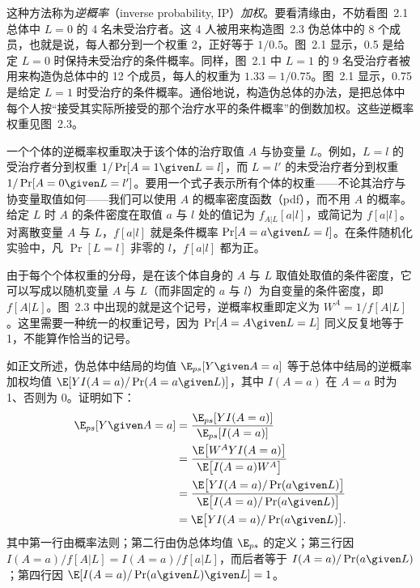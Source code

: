 这种方法称为\emph{逆概率}（inverse probability, IP）\emph{加权}。要看清缘由，不妨看图~2.1 总体中 $L=0$ 的 4 名未受治疗者。这 4 人被用来构造图~2.3 伪总体中的 8 个成员，也就是说，每人都分到一个权重 2，正好等于 $1/0.5$。图~2.1 显示，0.5 是给定 $L=0$ 时保持未受治疗的条件概率。同样，图~2.1 中 $L=1$ 的 9 名受治疗者被用来构造伪总体中的 12 个成员，每人的权重为 $1.33=1/0.75$。图~2.1 显示，0.75 是给定 $L=1$ 时受治疗的条件概率。通俗地说，构造伪总体的办法，是把总体中每个人按“接受其实际所接受的那个治疗水平的条件概率”的倒数加权。这些逆概率权重见图~2.3。


\begin{techpoint}[逆概率权重的形式定义]
一个个体的逆概率权重取决于该个体的治疗取值 $A$ 与协变量 $L$。例如，$L=l$ 的受治疗者分到权重 $1/\Pr[A=1\given L=l]$，而 $L=l'$ 的未受治疗者分到权重 $1/\Pr[A=0\given L=l']$。要用一个式子表示所有个体的权重——不论其治疗与协变量取值如何——我们可以使用 $A$ 的概率密度函数（pdf），而不用 $A$ 的概率。给定 $L$ 时 $A$ 的条件密度在取值 $a$ 与 $l$ 处的值记为 $f_{A|L}[a|l]$，或简记为 $f[a|l]$。对离散变量 $A$ 与 $L$，$f[a|l]$ 就是条件概率 $\Pr[A=a\given L=l]$。在条件随机化实验中，凡 $\Pr[L=l]$ 非零的 $l$，$f[a|l]$ 都为正。

由于每个个体权重的分母，是在该个体自身的 $A$ 与 $L$ 取值处取值的条件密度，它可以写成以随机变量 $A$ 与 $L$（而非固定的 $a$ 与 $l$）为自变量的条件密度，即 $f[A|L]$。图~2.3 中出现的就是这个记号，逆概率权重即定义为 $W^{A}=1/f[A|L]$。这里需要一种统一的权重记号，因为 $\Pr[A=A\given L=L]$ 同义反复地等于 1，不能算作恰当的记号。

如正文所述，伪总体中结局的均值 $\E_{ps}[Y\given A=a]$ 等于总体中结局的逆概率加权均值 $\E[YI(A=a)/\Pr(A=a\given L)]$，其中 $I(A=a)$ 在 $A=a$ 时为 1、否则为 0。证明如下：
\begin{align*}
\E_{ps}[Y\given A=a] &= \frac{\E_{ps}[YI(A=a)]}{\E_{ps}[I(A=a)]}\\
&= \frac{\E\bigl[W^{A}YI(A=a)\bigr]}{\E\bigl[I(A=a)W^{A}\bigr]}\\
&= \frac{\E\bigl[YI(A=a)/\Pr(a\given L)\bigr]}{\E\bigl[I(A=a)/\Pr(a\given L)\bigr]}\\
&= \E\bigl[YI(A=a)/\Pr(a\given L)\bigr].
\end{align*}
其中第一行由概率法则；第二行由伪总体均值 $\E_{ps}$ 的定义；第三行因 $I(A=a)/f[A|L]=I(A=a)/f[a|L]$，而后者等于 $I(A=a)/\Pr(a\given L)$；第四行因 $\E[I(A=a)/\Pr(a\given L)\given L]=1$。
\end{techpoint}

